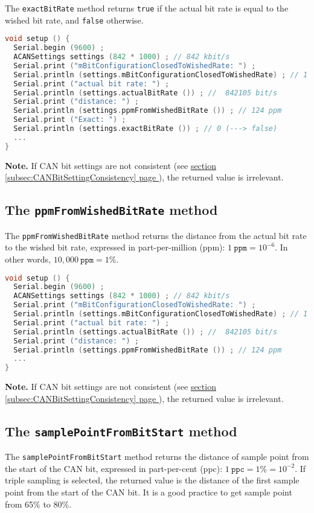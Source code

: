 \documentclass[10pt, a4paper, obeyspaces, openany]{extarticle}
\newcommand \subsectionLabel[2]{\subsection{#1}\label{subsec:#2}}
\newcommand\refSubsectionPage[1]{\hyperref[subsec:#1]{section \ref*{subsec:#1} page \pageref{subsec:#1}}}
\begin{document}
The \texttt{exactBitRate} method returns \texttt{true} if the actual bit rate is equal to the wished bit rate, and \texttt{false} otherwise.

{ \small\begin{lstlisting}[language=c++]
void setup () {
  Serial.begin (9600) ;
  ACANSettings settings (842 * 1000) ; // 842 kbit/s
  Serial.print ("mBitConfigurationClosedToWishedRate: ") ;
  Serial.println (settings.mBitConfigurationClosedToWishedRate) ; // 1 (--> is true)
  Serial.print ("actual bit rate: ") ;
  Serial.println (settings.actualBitRate ()) ; //  842105 bit/s
  Serial.print ("distance: ") ;
  Serial.println (settings.ppmFromWishedBitRate ()) ; // 124 ppm
  Serial.print ("Exact: ") ;
  Serial.println (settings.exactBitRate ()) ; // 0 (---> false)
  ...
}
\end{lstlisting}}

{\bf Note. } If CAN bit settings are not consistent (see \refSubsectionPage{CANBitSettingConsistency}), the returned value is irrelevant.






\subsectionLabel{The \texttt{ppmFromWishedBitRate} method}{ppmFromWishedBitRate}


The \texttt{ppmFromWishedBitRate} method returns the distance from the actual bit rate to the wished bit rate, expressed in part-per-million (ppm): $1~\texttt{ppm} = 10^{-6}$. In other words, $10,000~\texttt{ppm}=1\%$.

{ \small\begin{lstlisting}[language=c++]
void setup () {
  Serial.begin (9600) ;
  ACANSettings settings (842 * 1000) ; // 842 kbit/s
  Serial.print ("mBitConfigurationClosedToWishedRate: ") ;
  Serial.println (settings.mBitConfigurationClosedToWishedRate) ; // 1 (--> is true)
  Serial.print ("actual bit rate: ") ;
  Serial.println (settings.actualBitRate ()) ; //  842105 bit/s
  Serial.print ("distance: ") ;
  Serial.println (settings.ppmFromWishedBitRate ()) ; // 124 ppm
  ...
}
\end{lstlisting}}

{\bf Note. } If CAN bit settings are not consistent (see \refSubsectionPage{CANBitSettingConsistency}), the returned value is irrelevant.






\subsectionLabel{The \texttt{samplePointFromBitStart} method}{samplePointFromBitStart}


The \texttt{samplePointFromBitStart} method returns the distance of sample point from the start of the CAN bit, expressed in part-per-cent (ppc): $1~\texttt{ppc} = 1\% = 10^{-2}$. If triple sampling is selected, the returned value is the distance of the first sample point from the start of the CAN bit. It is a good practice to get sample point from 65\% to 80\%.
\end{document}
